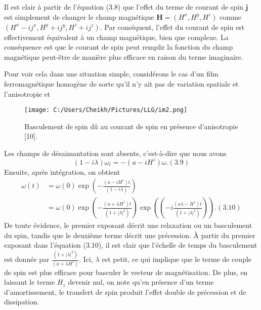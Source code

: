 \documentclass{article}
\begin{document}
	Il est clair à partir de l'équation (3.8) que l'effet du terme de courant de spin $\mathbf{j}$ est simplement de changer le champ magnétique $\mathbf{H} = (H^{x}, H^{y}, H^{z})$ comme $(H^{x} - ij^{x}, H^{y} + ij^{y}, H^{z} + ij^{z})$. Par conséquent, l'effet du courant de spin est effectivement équivalent à un champ magnétique, bien que complexe. La conséquence est que le courant de spin peut remplir la fonction du champ magnétique peut-être de manière plus efficace en raison du terme imaginaire.
	
	Pour voir cela dans une situation simple, considérons le cas d'un film ferromagnétique homogène de sorte qu'il n'y ait pas de variation spatiale et l'anisotropie et
		\begin{figure}[htbp]
		\centering
		\texttt{[image: C:/Users/Cheikh/Pictures/LLG/im2.png]}
		\caption{Basculement de spin dû au courant de spin en présence d'anisotropie [10].}
		\label{fig:spin_evolution}
	\end{figure}
	
	Les champs de désaimantation sont absents, c'est-à-dire que nous avons
	\[
	(1 - i\lambda)\omega_t = -(a - iH^{z})\omega. (3.9)
	\]
	Ensuite, après intégration, on obtient
	\begin{align*}
	\omega(t) &= \omega(0) \exp \left(-\frac{(a - iH^{z})t}{(1 - i\lambda)}\right)\\
	&= \omega(0) \exp \left(-\frac{(a + \lambda H^{z})t}{(1 + |\lambda|^{2})}\right) \exp \left(\left(-i\frac{(a\lambda -H^{z})t}{(1 + |\lambda|^{2})}\right)\right). (3.10)
	\end{align*}  
	De toute évidence, le premier exposant décrit une relaxation ou un basculement du spin, tandis que le deuxième terme décrit une précession. À partir du premier exposant dans l'équation (3.10), il est clair que l'échelle de temps du basculement est donnée par \(\frac{(1 + |\lambda|^2)}{(a + \lambda H^{z})}\). Ici, \(\lambda\) est petit, ce qui implique que le terme de couple de spin est plus efficace pour basculer le vecteur de magnétisation. De plus, en laissant le terme \(H_z\) devenir nul, on note qu'en présence d'un terme d'amortissement, le transfert de spin produit l'effet double de précession et de dissipation.
	
\end{document}
